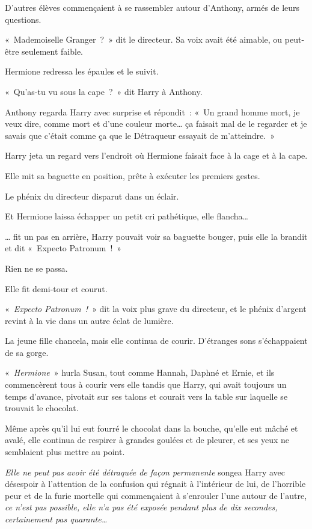 D'autres élèves commençaient à se rassembler autour d'Anthony, armés de leurs questions.

«~Mademoiselle Granger~?~» dit le directeur. Sa voix avait été aimable, ou peut-être seulement faible.

Hermione redressa les épaules et le suivit.

«~Qu'as-tu vu sous la cape~?~» dit Harry à Anthony.

Anthony regarda Harry avec surprise et répondit~: «~Un grand homme mort, je veux dire, comme mort et d'une couleur morte… ça faisait mal de le regarder et je savais que c'était comme ça que le Détraqueur essayait de m'atteindre.~»

Harry jeta un regard vers l'endroit où Hermione faisait face à la cage et à la cape.

Elle mit sa baguette en position, prête à exécuter les premiers gestes.

Le phénix du directeur disparut dans un éclair.

Et Hermione laissa échapper un petit cri pathétique, elle flancha…

… fit un pas en arrière, Harry pouvait voir sa baguette bouger, puis elle la brandit et dit «~Expecto Patronum~!~»

Rien ne se passa.

Elle fit demi-tour et courut.

«~\emph{Expecto Patronum~!}~» dit la voix plus grave du directeur, et le phénix d'argent revint à la vie dans un autre éclat de lumière.

La jeune fille chancela, mais elle continua de courir. D'étranges sons s'échappaient de sa gorge.

«~\emph{Hermione}~» hurla Susan, tout comme Hannah, Daphné et Ernie, et ils commencèrent tous à courir vers elle tandis que Harry, qui avait toujours un temps d'avance, pivotait sur ses talons et courait vers la table sur laquelle se trouvait le chocolat.

Même après qu'il lui eut fourré le chocolat dans la bouche, qu'elle eut mâché et avalé, elle continua de respirer à grandes goulées et de pleurer, et ses yeux ne semblaient plus mettre au point.

\emph{Elle ne peut pas avoir été détraquée de façon permanente} songea Harry avec désespoir à l'attention de la confusion qui régnait à l'intérieur de lui, de l'horrible peur et de la furie mortelle qui commençaient à s'enrouler l'une autour de l'autre, \emph{ce n'est pas possible, elle n'a pas été exposée pendant plus de dix secondes, certainement pas quarante…}

